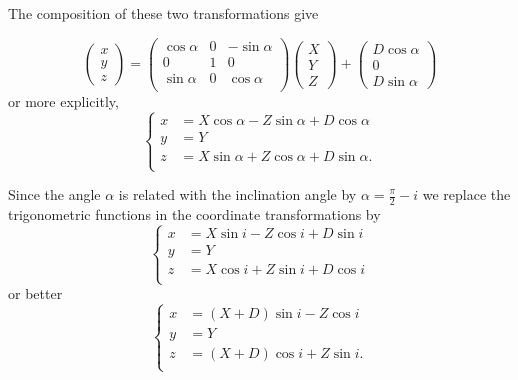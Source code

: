The composition of these two transformations give

\begin{equation}
\begin{pmatrix}
x \\
y \\
z
\end{pmatrix} =
\begin{pmatrix}
\cos \alpha & 0 &-\sin\alpha \\
0 & 1 &0\\
\sin \alpha &  0 & \cos \alpha\\
\end{pmatrix} 
\begin{pmatrix}
X\\
Y\\
Z
\end{pmatrix} +
\begin{pmatrix}
D \cos \alpha \\
0 \\
D \sin \alpha
\end{pmatrix}
\end{equation}
or more explicitly,
\begin{equation}
\begin{cases}
x &= X\cos \alpha - Z \sin\alpha + D \cos \alpha\\
y &= Y\\
z &= X \sin \alpha + Z \cos \alpha + D \sin \alpha .\\
\end{cases}
\end{equation}

Since the angle $\alpha$ is related with the inclination angle by $\alpha = \frac{\pi}{2} - i$ we replace the trigonometric functions in the coordinate transformations by
\begin{equation}
\begin{cases}
x &= X\sin i - Z \cos i + D \sin i\\
y &= Y\\
z &= X \cos i + Z \sin i + D \cos i\\
\end{cases}
\end{equation}
or better
\begin{equation}
\begin{cases}
x &= (X+D)\sin i - Z \cos i \\
y &= Y\\
z &= (X+D) \cos i + Z \sin i .\\
\end{cases}
\end{equation}

